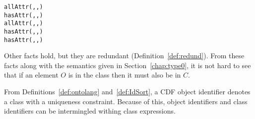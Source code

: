 \begin{example}
{\begin{tabbing}
\> {\tt allAttr(,,) } \\
\> \> {\tt hasAttr(,,) } \\
\> {\tt allAttr(,,) } \\
\> \> {\tt hasAttr(,,) } \\
\> \> {\tt hasAttr(,,) } 
\end{tabbing}
} 
\noindent
Other facts hold, but they are redundant
(Definition~\ref{def:redund}).  From these facts along with the
semantics given in Section~\ref{chap:type0}, it is not hard to see
that if an element $O$ is in the class {\tt {}}
then it must also be in $C$.
\end{example}
From Definitions~\ref{def:ontolang} and~\ref{def:IdSort}, a CDF object
identifier denotes a class with a uniqueness constraint.  Because of
this, object identifiers and class identifiers can be intermingled
withing class expressions.

